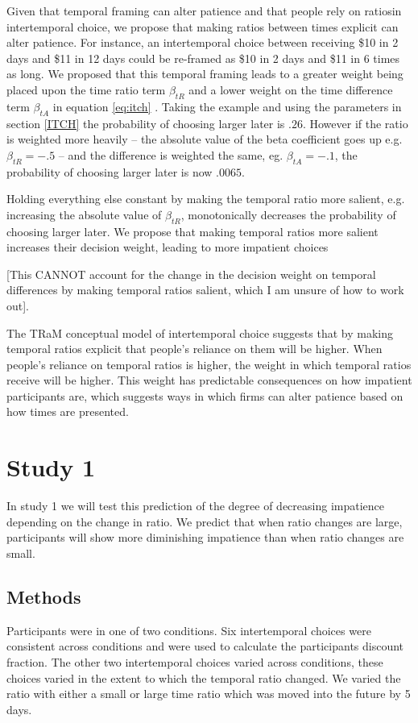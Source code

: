 \documentclass[]{article}
\begin{document}
Given that temporal framing can alter patience and that people rely on ratiosin intertemporal choice, we propose that making ratios between times explicit can alter patience. 
For instance, an intertemporal choice between receiving \$10 in 2 days and \$11 in 12 days could be re-framed as \$10 in 2 days and \$11 in 6 times as long. 
We proposed that this temporal framing leads to a greater weight being placed upon the time ratio term $\beta_{tR}$ and a lower weight on the time difference term $\beta_{tA}$ in equation \ref{eq:itch} . Taking the example and using the parameters in section \ref{ITCH} the probability of choosing larger later is $.26$. However if the ratio is weighted more heavily -- the absolute value of the beta coefficient goes up e.g.  $\beta_{tR} = -.5 $ -- and the difference is weighted the same, eg. $\beta_{tA} = -.1$, the probability of choosing larger later is now $.0065$. 

Holding everything else constant by making the temporal ratio more salient, e.g. increasing the absolute value of $\beta_{tR}$,  monotonically decreases the probability of choosing larger later. We propose that making temporal ratios more salient increases their decision weight, leading to more impatient choices

{\large [This CANNOT account for the change in the decision weight on temporal differences by making temporal ratios salient, which I am unsure of how to work out]. 
}

The TRaM conceptual model of intertemporal choice suggests that by making temporal ratios explicit that people's reliance on them will be higher.
When people's reliance on temporal ratios is higher, the weight in which temporal ratios receive will be higher. 
This weight has predictable consequences on how impatient participants are, which suggests ways in which firms can alter patience based on how times are presented. 




\section{Study 1}

In study 1 we will test this prediction of the degree of decreasing impatience depending on the change in ratio.
We predict that when ratio changes are large, participants will show more diminishing impatience than when ratio changes are small. 

\subsection{Methods}
Participants were in one of two conditions. 
Six intertemporal choices were consistent across conditions and were used to calculate the participants discount fraction.
The other two intertemporal choices varied across conditions, these choices varied in the extent to which the temporal ratio changed.
We varied the ratio with either a small or large time ratio which was moved into the future by 5 days. 
\end{document}
